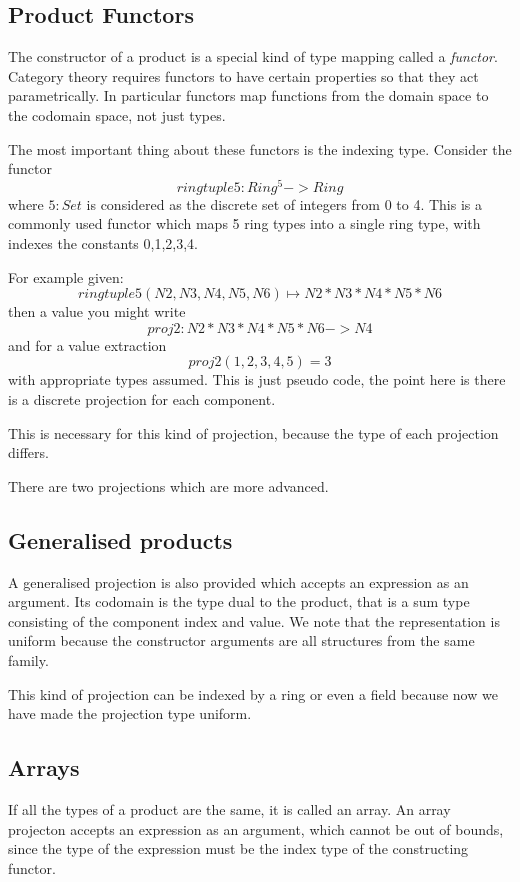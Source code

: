 \documentclass[oneside]{book}
\theoremstyle{plain}
\theoremstyle{definition}
\theoremstyle{plain}
\begin{document}
\subsection{Product Functors}
The constructor of a product is a special kind of type mapping called a {\em functor}.
Category theory requires functors to have certain properties so that they
act parametrically. In particular functors map functions from the domain space
to the codomain space, not just types.

The most important thing about these functors is the indexing type.
Consider the functor
$$ringtuple5: Ring ^ 5 -> Ring$$
where $5:Set$ is considered as the discrete set of integers from 0 to 4.
This is a commonly used functor which maps 5 ring types into a single ring type,
with indexes the constants 0,1,2,3,4.

For example given:
$$ringtuple5 (N2, N3, N4, N5, N6) \mapsto N2 * N3 * N4 * N5 * N6$$
then  a value you might write
$$proj2: N2 * N3 * N4 * N5 * N6 -> N4$$
and for a value extraction
$$proj2 (1,2,3,4,5) = 3$$
with appropriate types assumed. This is just pseudo code, the point
here is there is a discrete projection for each component.

This is necessary for this kind of projection, because the type of each
projection differs.

There are two projections which are more advanced.

\subsection{Generalised products}
A generalised projection is also provided which accepts an
expression as an argument. Its codomain is the type dual
to the product, that is a sum type consisting of the component
index and value.  We note that the representation is uniform because
the constructor arguments are all structures from the same family.

This kind of projection can be indexed by a ring or even a field
because now we have made the projection type uniform.

\subsection{Arrays}
If all the types of a product are the same, it is called an array.
An array projecton accepts an expression as an argument, which cannot
be out of bounds, since the type of the expression must be the index
type of the constructing functor.
\end{document}
